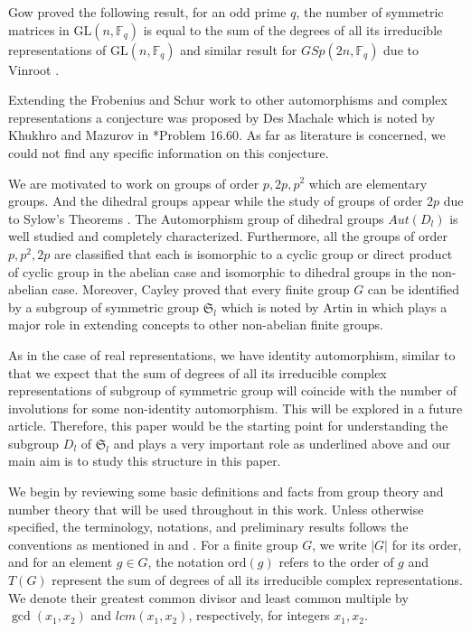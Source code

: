 \documentclass{amsart}
\theoremstyle{definition}
\theoremstyle{remark}
\newcommand{\lcm}{lcm}
\newcommand{\Aut}{Aut}
\numberwithin{equation}{section}
\begin{document}
    Gow \cite{MR716800} proved the following result, for an odd prime $q$, the number of symmetric matrices in $\mathrm{GL}(n, \mathbb{F}_q)$ is equal to the sum of the degrees of all its irreducible representations of $\mathrm{GL}(n, \mathbb{F}_q)$ and similar result for $GSp(2n,\mathbb{F}_q)$ due to Vinroot \cite{MR2173976}.

     Extending the Frobenius and Schur work to other automorphisms and complex representations a conjecture was proposed by Des Machale which is noted by Khukhro and Mazurov in \cite{MR1392713}*{Problem 16.60}. As far as literature is concerned, we could not find any specific information on this conjecture.

    We are motivated to work on groups of order $p, 2p, p^2$ which are elementary groups. And the dihedral groups appear while the study of groups of order $2p$ due to Sylow's Theorems \cite{MR2286236}.
    The Automorphism group of dihedral groups $\Aut(D_l)$ is well studied and completely characterized. Furthermore, all the groups of order $p, p^2, 2p$ are classified that each is isomorphic to a cyclic group or direct product of cyclic group in the abelian case and isomorphic to dihedral groups in the non-abelian case. Moreover, Cayley proved that every finite group $G$ can be identified by a subgroup of symmetric group $\mathfrak{S}_l$ which is noted by Artin in \cite{MR1129886} which plays a major role in extending concepts to other non-abelian finite groups.

    As in the case of real representations, we have identity automorphism, similar to that we expect that the sum of degrees of all its irreducible complex representations of subgroup of symmetric group will coincide with the number of involutions for some non-identity automorphism. This will be explored in a future article. Therefore, this paper would be the starting point for understanding the subgroup $D_l$ of $\mathfrak{S}_l$ and plays a very important role as underlined above and our main aim is to study this structure in this paper.

    We begin by reviewing some basic definitions and facts from group theory and number theory that will be used throughout in this work. Unless otherwise specified, the terminology, notations, and preliminary results follows the conventions as mentioned in \cite{MR1129886} and \cite{MR2286236}. For a finite group $G$, we write $|G|$ for its order, and for an element $g \in G$, the notation $\mathrm{ord}(g)$ refers to the order of $g$ and $T(G)$ represent the sum of degrees of all its irreducible complex representations. We denote their greatest common divisor and least common multiple by $\gcd(x_1, x_2)$ and $\lcm(x_1, x_2)$, respectively, for integers $x_1, x_2$.
    
\end{document}
